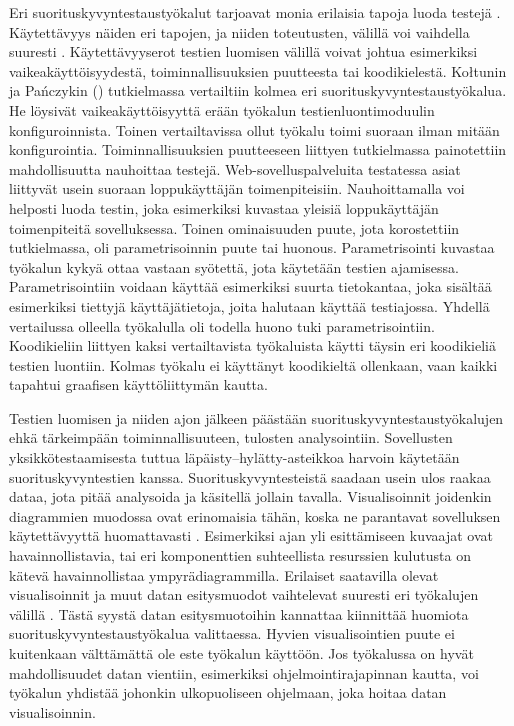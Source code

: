 Eri suorituskyvyntestaustyökalut tarjoavat monia erilaisia tapoja luoda testejä \parencite[15]{TheArtOfApplication}. Käytettävyys näiden eri tapojen, ja niiden toteutusten, välillä voi vaihdella suuresti \parencite{EvaluatingAndImplementing}. Käytettävyyserot testien luomisen välillä voivat johtua esimerkiksi vaikeakäyttöisyydestä, toiminnallisuuksien puutteesta tai koodikielestä. Kołtunin ja Pańczykin (\citeyear{ComparativeAnalysisOfWeb}) tutkielmassa vertailtiin kolmea eri suorituskyvyntestaustyökalua. He löysivät vaikeakäyttöisyyttä erään työkalun testienluontimoduulin konfiguroinnista. Toinen vertailtavissa ollut työkalu toimi suoraan ilman mitään konfigurointia. Toiminnallisuuksien puutteeseen liittyen tutkielmassa painotettiin mahdollisuutta nauhoittaa testejä. Web-sovelluspalveluita testatessa asiat liittyvät usein suoraan loppukäyttäjän toimenpiteisiin. Nauhoittamalla voi helposti luoda testin, joka esimerkiksi kuvastaa yleisiä loppukäyttäjän toimenpiteitä sovelluksessa. Toinen ominaisuuden puute, jota korostettiin tutkielmassa, oli parametrisoinnin puute tai huonous. Parametrisointi kuvastaa työkalun kykyä ottaa vastaan syötettä, jota käytetään testien ajamisessa. Parametrisointiin voidaan käyttää esimerkiksi suurta tietokantaa, joka sisältää esimerkiksi tiettyjä käyttäjätietoja, joita halutaan käyttää testiajossa. Yhdellä vertailussa olleella työkalulla oli todella huono tuki parametrisointiin. Koodikieliin liittyen kaksi vertailtavista työkaluista käytti täysin eri koodikieliä testien luontiin. Kolmas työkalu ei käyttänyt koodikieltä ollenkaan, vaan kaikki tapahtui graafisen käyttöliittymän kautta.

Testien luomisen ja niiden ajon jälkeen päästään suorituskyvyntestaustyökalujen ehkä tärkeimpään toiminnallisuuteen, tulosten analysointiin. Sovellusten yksikkötestaamisesta tuttua läpäisty--hylätty-asteikkoa harvoin käytetään suorituskyvyntestien kanssa. Suorituskyvyntesteistä saadaan usein ulos raakaa dataa, jota pitää analysoida ja käsitellä jollain tavalla. Visualisoinnit joidenkin diagrammien muodossa ovat erinomaisia tähän, koska ne parantavat sovelluksen käytettävyyttä huomattavasti \parencite{ExtractingUsabilityInformation}. Esimerkiksi ajan yli esittämiseen kuvaajat ovat havainnollistavia, tai eri komponenttien suhteellista resurssien kulutusta on kätevä havainnollistaa ympyrädiagrammilla. Erilaiset saatavilla olevat visualisoinnit ja muut datan esitysmuodot vaihtelevat suuresti eri työkalujen välillä \parencite{SoftwareAndPerformanceTestingTools}. Tästä syystä datan esitysmuotoihin kannattaa kiinnittää huomiota suorituskyvyntestaustyökalua valittaessa. Hyvien visualisointien puute ei kuitenkaan välttämättä ole este työkalun käyttöön. Jos työkalussa on hyvät mahdollisuudet datan vientiin, esimerkiksi ohjelmointirajapinnan kautta, voi työkalun yhdistää johonkin ulkopuoliseen ohjelmaan, joka hoitaa datan visualisoinnin.
